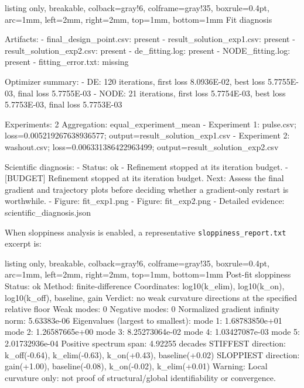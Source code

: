 \begin{tcblisting}{
  listing only,
  breakable,
  colback=gray!6,
  colframe=gray!35,
  boxrule=0.4pt,
  arc=1mm,
  left=2mm,
  right=2mm,
  top=1mm,
  bottom=1mm
}
Fit diagnosis

Artifacts:
- final_design_point.csv: present
- result_solution_exp1.csv: present
- result_solution_exp2.csv: present
- de_fitting.log: present
- NODE_fitting.log: present
- fitting_error.txt: missing

Optimizer summary:
- DE: 120 iterations, first loss 8.0936E-02,
      best loss 5.7755E-03, final loss 5.7755E-03
- NODE: 21 iterations, first loss 5.7754E-03,
        best loss 5.7753E-03, final loss 5.7753E-03

Experiments: 2
Aggregation: equal_experiment_mean
- Experiment 1: pulse.csv; loss=0.005219267638936577;
  output=result_solution_exp1.csv
- Experiment 2: washout.csv; loss=0.006331386422963499;
  output=result_solution_exp2.csv

Scientific diagnosis:
- Status: ok
- Refinement stopped at its iteration budget.
- [BUDGET] Refinement stopped at its iteration budget.
  Next: Assess the final gradient and trajectory plots before
  deciding whether a gradient-only restart is worthwhile.
- Figure: fit_exp1.png
- Figure: fit_exp2.png
- Detailed evidence: scientific_diagnosis.json
\end{tcblisting}

When sloppiness analysis is enabled, a representative
\texttt{sloppiness\_report.txt} excerpt is:

\begin{tcblisting}{
  listing only,
  breakable,
  colback=gray!6,
  colframe=gray!35,
  boxrule=0.4pt,
  arc=1mm,
  left=2mm,
  right=2mm,
  top=1mm,
  bottom=1mm
}
Post-fit sloppiness
Status: ok
Method: finite-difference
Coordinates: log10(k_elim), log10(k_on), log10(k_off), baseline, gain
Verdict: no weak curvature directions at the specified relative floor
Weak modes: 0
Negative modes: 0
Normalized gradient infinity norm: 5.63383e-06
Eigenvalues (largest to smallest):
  mode 1: 1.68783850e+01
  mode 2: 1.26587665e+00
  mode 3: 8.25273064e-02
  mode 4: 1.03427087e-03
  mode 5: 2.01732936e-04
Positive spectrum span: 4.92255 decades
STIFFEST direction: k_off(-0.64), k_elim(-0.63),
                   k_on(+0.43), baseline(+0.02)
SLOPPIEST direction: gain(+1.00), baseline(-0.08),
                    k_on(-0.02), k_elim(+0.01)
Warning: Local curvature only: not proof of structural/global
identifiability or convergence.
\end{tcblisting}

